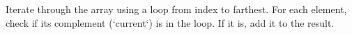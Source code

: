 \documentclass[preview]{standalone}
\begin{document}
Iterate through the array using a loop from index to farthest. For each element, check if its complement (`current`) is in the loop. If it is, add it to the result.\\
\end{document}
